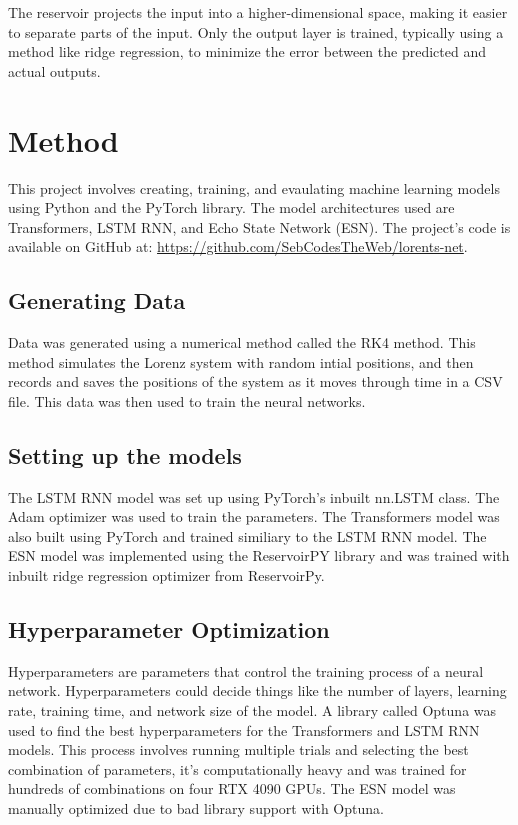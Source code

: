 \documentclass[11pt]{article}
\begin{document}
The reservoir projects the input into a higher-dimensional space, making it easier to separate parts of the input. Only the output layer is trained, typically using a method like ridge regression, to minimize the error between the predicted and actual outputs.


\section{Method}
This project involves creating, training, and evaulating machine learning models using Python and the PyTorch library. The model architectures used are Transformers, LSTM RNN, and Echo State Network (ESN). The project's code is available on GitHub at: \url{https://github.com/SebCodesTheWeb/lorents-net}.

\subsection{Generating Data}

Data was generated using a numerical method called the RK4 method. This method simulates the Lorenz system with random intial positions, and then records and saves the positions of the system as it moves through time in a CSV file. This data was then used to train the neural networks.

\subsection{Setting up the models}
The LSTM RNN model was set up using PyTorch's inbuilt nn.LSTM class. The Adam optimizer was used to train the parameters. The Transformers model was also built using PyTorch and trained similiary to the LSTM RNN model. The ESN model was implemented using the ReservoirPY library and was trained with inbuilt ridge regression optimizer from ReservoirPy.

\subsection{Hyperparameter Optimization}
Hyperparameters are parameters that control the training process of a neural network. Hyperparameters could decide things like the number of layers, learning rate, training time, and network size of the model. A library called Optuna was used to find the best hyperparameters for the Transformers and LSTM RNN models. This process involves running multiple trials and selecting the best combination of parameters, it's computationally heavy and was trained for hundreds of combinations on four RTX 4090 GPUs. The ESN model was manually optimized due to bad library support with Optuna.
\end{document}
